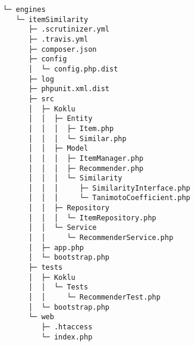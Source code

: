 \begin{codebox}
\begin{verbatim}
└─ engines
   └─ itemSimilarity
      ├─ .scrutinizer.yml
      ├─ .travis.yml
      ├─ composer.json
      ├─ config
      │  └─ config.php.dist
      ├─ log
      ├─ phpunit.xml.dist
      ├─ src
      │  ├─ Koklu
      │  │  ├─ Entity
      │  │  │  ├─ Item.php
      │  │  │  └─ Similar.php
      │  │  ├─ Model
      │  │  │  ├─ ItemManager.php
      │  │  │  ├─ Recommender.php
      │  │  │  └─ Similarity
      │  │  │     ├─ SimilarityInterface.php
      │  │  │     └─ TanimotoCoefficient.php
      │  │  ├─ Repository
      │  │  │  └─ ItemRepository.php
      │  │  └─ Service
      │  │     └─ RecommenderService.php
      │  ├─ app.php
      │  └─ bootstrap.php
      ├─ tests
      │  ├─ Koklu
      │  │  └─ Tests
      │  │     └─ RecommenderTest.php
      │  └─ bootstrap.php
      └─ web
         ├─ .htaccess
         └─ index.php

\end{verbatim}
\end{codebox}

